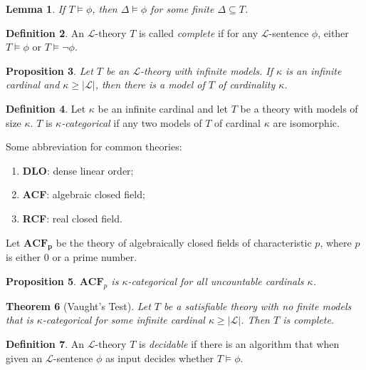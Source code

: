 \documentclass{amsart}
\newtheorem{theorem}{Theorem}[section]
\newtheorem{lemma}[theorem]{Lemma}
\newtheorem{proposition}[theorem]{Proposition}
\theoremstyle{definition}
\newtheorem{definition}[theorem]{Definition}
\numberwithin{equation}{section}
\begin{document}
\begin{lemma}
    If $T \models \phi$, then $\Delta \models \phi$ for some finite $\Delta \subseteq T$.
\end{lemma}

\begin{definition}
    An $\mathcal{L}$-theory $T$ is called \emph{complete} if for any $\mathcal{L}$-sentence $\phi$,
    either $T \models \phi$ or $T \models \neg\phi$.
\end{definition}

\begin{proposition}
    Let $T$ be an $\mathcal{L}$-theory with infinite models.
    If $\kappa$ is an infinite cardinal and $\kappa \ge |\mathcal{L}|$,
    then there is a model of $T$ of cardinality $\kappa$.
\end{proposition}

\begin{definition}
    Let $\kappa$ be an infinite cardinal and let $T$ be a theory with models of size $\kappa$.
    $T$ is \emph{$\kappa$-categorical} if any two models of $T$ of cardinal $\kappa$ are isomorphic.
\end{definition}

Some abbreviation for common theories:
\begin{enumerate}[label = {}]
    \item \textbf{DLO}: dense linear order;
    \item \textbf{ACF}: algebraic closed field;
    \item \textbf{RCF}: real closed field.
\end{enumerate}

Let $\mathbf{ACF_p}$ be the theory of algebraically closed fields of characteristic $p$,
where $p$ is either $0$ or a prime number.

\begin{proposition} 
    $\mathbf{ACF}_p$ is $\kappa$-categorical for all uncountable cardinals $\kappa$.
\end{proposition}

\begin{theorem}[Vaught's Test]
    Let $T$ be a satisfiable theory with no finite models that is 
    $\kappa$-categorical for some infinite cardinal $\kappa \ge |\mathcal{L}|$.
    Then $T$ is complete.
\end{theorem}

\begin{definition}
    An $\mathcal{L}$-theory $T$ is \emph{decidable} if there is an algorithm that when given an $\mathcal{L}$-sentence $\phi$ as input decides whether $T \models \phi$.
\end{definition}
\end{document}
